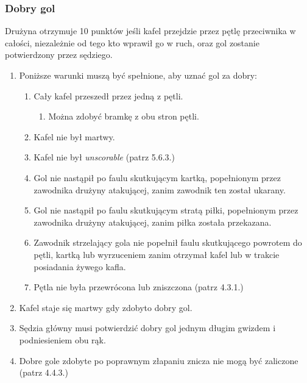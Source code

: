 \documentclass[11pt,a4paper]{article}
\begin{document}
\subsubsection{Dobry gol}
Drużyna otrzymuje 10 punktów jeśli kafel przejdzie przez pętlę przeciwnika w całości, niezależnie od tego kto wprawił go w ruch, oraz gol zostanie potwierdzony przez sędziego.
\begin{enumerate}
  \item Poniższe warunki muszą być spełnione, aby uznać gol za dobry:
  \begin{enumerate}
    \item Cały kafel przeszedł przez jedną z pętli.
    \begin{enumerate}
      \item Można zdobyć bramkę z obu stron pętli.
    \end{enumerate}
    \item Kafel nie był martwy.
    \item Kafel nie był \emph{unscorable} (patrz 5.6.3.) %
    \item Gol nie nastąpił po faulu skutkującym kartką, popełnionym przez zawodnika drużyny atakującej, zanim zawodnik ten został ukarany.
    \item Gol nie nastąpił po faulu skutkującym stratą piłki, popełnionym przez zawodnika drużyny atakującej, zanim piłka została przekazana.
    \item Zawodnik strzelający gola nie popełnił faulu skutkującego powrotem do pętli, kartką lub wyrzuceniem zanim otrzymał kafel lub w trakcie posiadania żywego kafla.
    \item Pętla nie była przewrócona lub zniszczona (patrz 4.3.1.) %
  \end{enumerate}
  \item Kafel staje się martwy gdy zdobyto dobry gol.
  \item Sędzia główny musi potwierdzić dobry gol jednym długim gwizdem i podniesieniem obu rąk.
  \item Dobre gole zdobyte po poprawnym złapaniu znicza nie mogą być zaliczone (patrz 4.4.3.) %
\end{enumerate}
\end{document}
